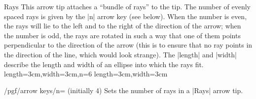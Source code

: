 \begin{arrowtip}{Rays}{
    This arrow tip attaches a ``bundle of rays'' to the tip. The number of
    evenly spaced rays is given by the |n| arrow key (see below). When the
    number is even, the rays will lie to the left and to the right of the
    direction of the arrow; when the number is odd, the rays are rotated in
    such a way that one of them points perpendicular to the direction of the
    arrow (this is to ensure that no ray points in the direction of the line,
    which would look strange). The |length| and |width| describe the length and
    width of an ellipse into which the rays fit.
}%
{length=3cm,width=3cm,n=6}%
{length=3cm,width=3cm}

    \begin{arrowexamples}
        \arrowexample[]
        \arrowexampledup[sep]
        \arrowexampledupdot[sep]
        \arrowexample[width'=0pt 2]
        \arrowexample[round]
        \arrowexample[n=2]
        \arrowexample[n=3]
        \arrowexample[n=4]
        \arrowexample[n=5]
        \arrowexample[n=6]
        \arrowexample[n=7]
        \arrowexample[n=8]
        \arrowexample[n=9]
        \arrowexample[slant=.3]
        \arrowexample[left]
        \arrowexample[right]
        \arrowexample[left,n=5]
        \arrowexample[right,n=5]
        \arrowexample[red]
    \end{arrowexamples}
\end{arrowtip}

\begin{key}{/pgf/arrow keys/n= (initially 4)}
    Sets the number of rays in a |Rays| arrow tip.
\end{key}
